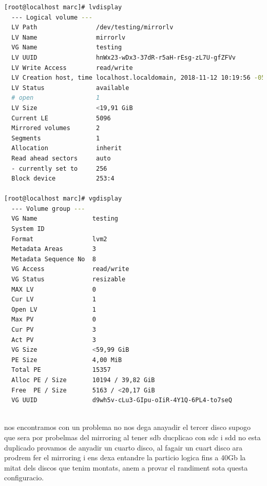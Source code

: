 \documentclass[preprint,11pt]{elsarticle}
\begin{document}
\begin{lstlisting}[basicstyle=\tiny, language=bash]
[root@localhost marc]# lvdisplay 
  --- Logical volume ---
  LV Path                /dev/testing/mirrorlv
  LV Name                mirrorlv
  VG Name                testing
  LV UUID                hnWx23-wDx3-37dR-r5aH-rEsg-zL7U-gfZFVv
  LV Write Access        read/write
  LV Creation host, time localhost.localdomain, 2018-11-12 10:19:56 -0500
  LV Status              available
  # open                 1
  LV Size                <19,91 GiB
  Current LE             5096
  Mirrored volumes       2
  Segments               1
  Allocation             inherit
  Read ahead sectors     auto
  - currently set to     256
  Block device           253:4
   
[root@localhost marc]# vgdisplay 
  --- Volume group ---
  VG Name               testing
  System ID             
  Format                lvm2
  Metadata Areas        3
  Metadata Sequence No  8
  VG Access             read/write
  VG Status             resizable
  MAX LV                0
  Cur LV                1
  Open LV               1
  Max PV                0
  Cur PV                3
  Act PV                3
  VG Size               <59,99 GiB
  PE Size               4,00 MiB
  Total PE              15357
  Alloc PE / Size       10194 / 39,82 GiB
  Free  PE / Size       5163 / <20,17 GiB
  VG UUID               d9wh5v-cLu3-GIpu-oIiR-4Y1Q-6PL4-to7seQ



\end{lstlisting}

nos encontramos con un problema no nos dega anayadir el tercer disco supogo que sera por probelmas del mirroring al tener sdb ducplicao con sdc i sdd no esta duplicado provamos de anyadir un cuarto disco,  al fagair un cuart disco ara prodrem fer el mirroring i ens dexa entandre la particio logica fins a 40Gb la mitat dels discos que tenim montats, anem a provar el randiment sota questa configuracio. 
\end{document}
